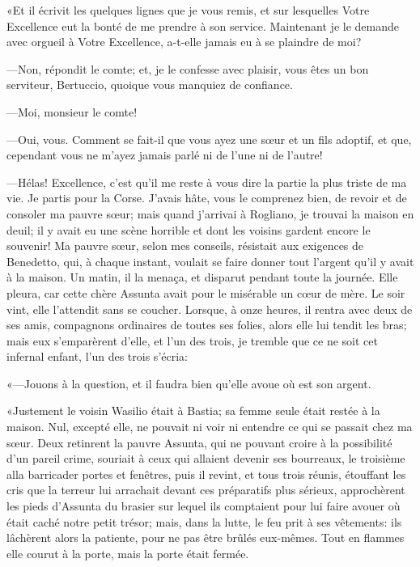 «Et il écrivit les quelques lignes que je vous remis, et sur lesquelles Votre Excellence eut la bonté de me prendre à son service. Maintenant je le demande avec orgueil à Votre Excellence, a-t-elle jamais eu à se plaindre de moi?  

—Non, répondit le comte; et, je le confesse avec plaisir, vous êtes un bon serviteur, Bertuccio, quoique vous manquiez de confiance. 

—Moi, monsieur le comte! 

—Oui, vous. Comment se fait-il que vous ayez une sœur et un fils adoptif, et que, cependant vous ne m'ayez jamais parlé ni de l'une ni de l'autre! 

—Hélas! Excellence, c'est qu'il me reste à vous dire la partie la plus triste de ma vie. Je partis pour la Corse. J'avais hâte, vous le comprenez bien, de revoir et de consoler ma pauvre sœur; mais quand j'arrivai à Rogliano, je trouvai la maison en deuil; il y avait eu une scène horrible et dont les voisins gardent encore le souvenir! Ma pauvre sœur, selon mes conseils, résistait aux exigences de Benedetto, qui, à chaque instant, voulait se faire donner tout l'argent qu'il y avait à la maison. Un matin, il la menaça, et disparut pendant toute la journée. Elle pleura, car cette chère Assunta avait pour le misérable un cœur de mère. Le soir vint, elle l'attendit sans se coucher. Lorsque, à onze heures, il rentra avec deux de ses amis, compagnons ordinaires de toutes ses folies, alors elle lui tendit les bras; mais eux s'emparèrent d'elle, et l'un des trois, je tremble que ce ne soit cet infernal enfant, l'un des trois s'écria: 

«—Jouons à la question, et il faudra bien qu'elle avoue où est son argent.  

«Justement le voisin Wasilio était à Bastia; sa femme seule était restée à la maison. Nul, excepté elle, ne pouvait ni voir ni entendre ce qui se passait chez ma sœur. Deux retinrent la pauvre Assunta, qui ne pouvant croire à la possibilité d'un pareil crime, souriait à ceux qui allaient devenir ses bourreaux, le troisième alla barricader portes et fenêtres, puis il revint, et tous trois réunis, étouffant les cris que la terreur lui arrachait devant ces préparatifs plus sérieux, approchèrent les pieds d'Assunta du brasier sur lequel ils comptaient pour lui faire avouer où était caché notre petit trésor; mais, dans la lutte, le feu prit à ses vêtements: ils lâchèrent alors la patiente, pour ne pas être brûlés eux-mêmes. Tout en flammes elle courut à la porte, mais la porte était fermée. 

